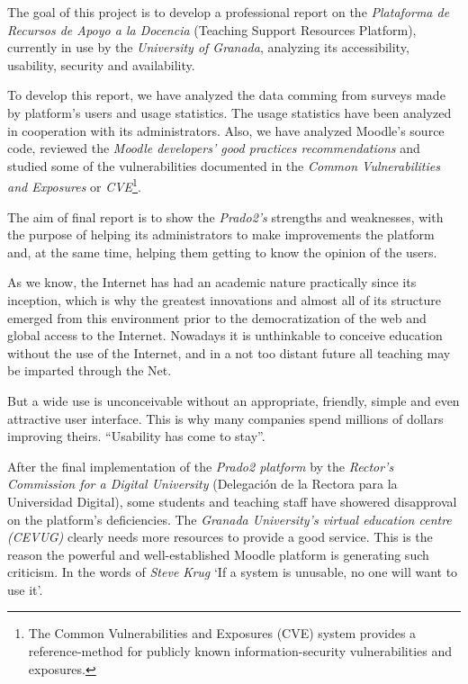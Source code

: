 {{The goal of this project is to develop a professional report on the \textit{Plataforma de Recursos de Apoyo a la Docencia} (Teaching Support Resources Platform), currently in use by the \textit{University of Granada}, analyzing its accessibility, usability, security and availability.

\bigskip
To develop this report, we have analyzed the data comming from surveys made by platform's users and usage statistics. The usage statistics have been analyzed in cooperation with its administrators. Also, we have analyzed Moodle's source code, reviewed the \textit{Moodle developers' good practices recommendations} and studied some of the vulnerabilities documented in the \textit{Common Vulnerabilities and Exposures} or \textit{CVE}\footnote{The Common Vulnerabilities and Exposures (CVE) system provides a reference-method for publicly known information-security vulnerabilities and exposures.}.

\bigskip
The aim of final report is to show the \textit{Prado2's} strengths and weaknesses, with the purpose of helping its administrators to make improvements the platform and, at the same time, helping them getting to know the opinion of the users.

\bigskip
As we know, the Internet has had an academic nature practically since its inception, which is why the greatest innovations and almost all of its structure emerged from this environment prior to the democratization of the web and global access to the Internet.  Nowadays it is unthinkable to conceive education without the use of the Internet, and in a not too distant future all teaching may be imparted through the Net.

\bigskip
But a wide use is unconceivable without an appropriate, friendly, simple and even attractive user interface. This is why many companies spend millions of dollars improving theirs. ``Usability has come to stay''.\cite{jakonielsen}

\bigskip
After the final implementation of the \textit{Prado2 platform} by the \textit{Rector’s Commission for a Digital University} (Delegación de la Rectora para la Universidad Digital), some students and teaching staff have showered disapproval on the platform’s deficiencies. The \textit{Granada University’s virtual education centre (CEVUG)} clearly needs more resources to provide a good service. This is the reason the powerful and well-established Moodle platform is  generating such criticism. In the words of \textit{Steve Krug} ‘If a system is unusable, no one will want to use it’\cite{stevekrug}.

}}
